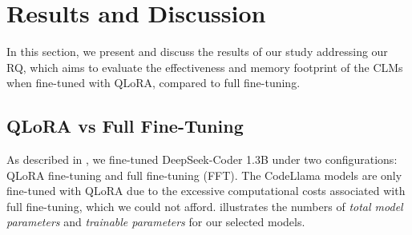 

\section{Results and Discussion}
\label{sec:results}



In this section, we present and discuss the results of our study addressing our RQ, which aims to evaluate the effectiveness and memory footprint of the CLMs when fine-tuned with QLoRA, compared to full fine-tuning.  

\subsection{QLoRA vs Full Fine-Tuning}

As described in , we fine-tuned DeepSeek-Coder 1.3B under two configurations: QLoRA fine-tuning and full fine-tuning (FFT). The CodeLlama models are only fine-tuned with QLoRA due to the excessive computational costs associated with full fine-tuning, which we could not afford.  illustrates the numbers of \textit{total model parameters} and \textit{trainable parameters} for our selected models. 



%
%






